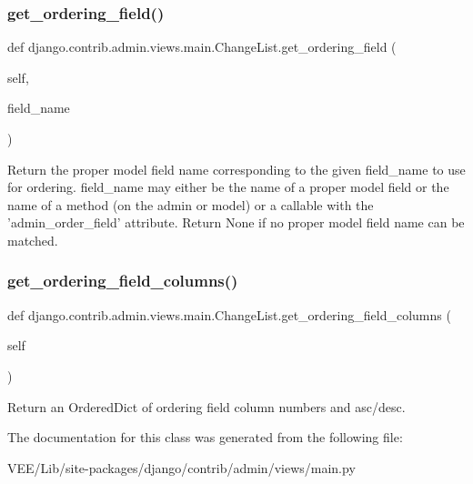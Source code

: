 \subsubsection{\texorpdfstring{get\+\_\+ordering\+\_\+field()}{get\_ordering\_field()}}
{\footnotesize\ttfamily def django.\+contrib.\+admin.\+views.\+main.\+Change\+List.\+get\+\_\+ordering\+\_\+field (\begin{DoxyParamCaption}\item[{}]{self,  }\item[{}]{field\+\_\+name }\end{DoxyParamCaption})}

\begin{DoxyVerb}Return the proper model field name corresponding to the given
field_name to use for ordering. field_name may either be the name of a
proper model field or the name of a method (on the admin or model) or a
callable with the 'admin_order_field' attribute. Return None if no
proper model field name can be matched.
\end{DoxyVerb}
 \mbox{\label{classdjango_1_1contrib_1_1admin_1_1views_1_1main_1_1_change_list_ad365f8c2acd6830baf1c62ed771da06d}} 
\subsubsection{\texorpdfstring{get\+\_\+ordering\+\_\+field\+\_\+columns()}{get\_ordering\_field\_columns()}}
{\footnotesize\ttfamily def django.\+contrib.\+admin.\+views.\+main.\+Change\+List.\+get\+\_\+ordering\+\_\+field\+\_\+columns (\begin{DoxyParamCaption}\item[{}]{self }\end{DoxyParamCaption})}

\begin{DoxyVerb}Return an OrderedDict of ordering field column numbers and asc/desc.
\end{DoxyVerb}
 

The documentation for this class was generated from the following file\+:\begin{DoxyCompactItemize}
\item 
V\+E\+E/\+Lib/site-\/packages/django/contrib/admin/views/main.\+py\end{DoxyCompactItemize}
